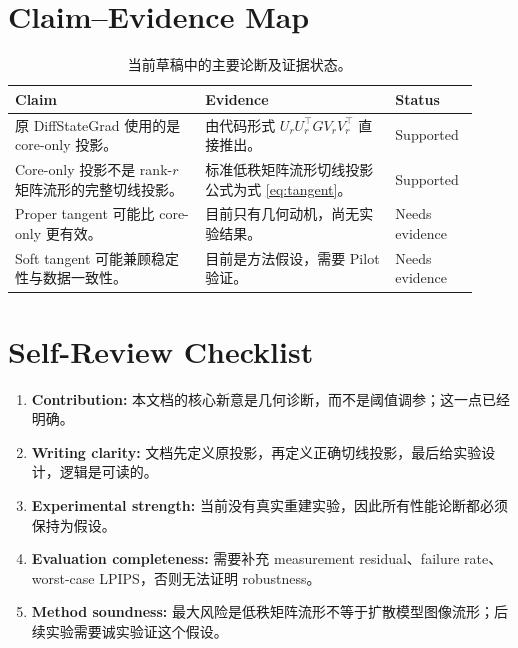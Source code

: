 \documentclass[11pt]{article}
\begin{document}
\section*{Claim--Evidence Map}

\begin{table}[h]
\centering
\caption{当前草稿中的主要论断及证据状态。}
\label{tab:claims}
\begin{tabular}{p{0.38\linewidth}p{0.38\linewidth}p{0.16\linewidth}}
\toprule
Claim & Evidence & Status \\
\midrule
原 DiffStateGrad 使用的是 core-only 投影。 &
由代码形式 $U_rU_r^\top G V_rV_r^\top$ 直接推出。 &
Supported \\
\addlinespace
Core-only 投影不是 rank-$r$ 矩阵流形的完整切线投影。 &
标准低秩矩阵流形切线投影公式为式 \eqref{eq:tangent}。 &
Supported \\
\addlinespace
Proper tangent 可能比 core-only 更有效。 &
目前只有几何动机，尚无实验结果。 &
Needs evidence \\
\addlinespace
Soft tangent 可能兼顾稳定性与数据一致性。 &
目前是方法假设，需要 Pilot 验证。 &
Needs evidence \\
\bottomrule
\end{tabular}
\end{table}

\section*{Self-Review Checklist}

\begin{enumerate}[label=\textbf{\arabic*.}]
    \item \textbf{Contribution:} 本文档的核心新意是几何诊断，而不是阈值调参；这一点已经明确。
    \item \textbf{Writing clarity:} 文档先定义原投影，再定义正确切线投影，最后给实验设计，逻辑是可读的。
    \item \textbf{Experimental strength:} 当前没有真实重建实验，因此所有性能论断都必须保持为假设。
    \item \textbf{Evaluation completeness:} 需要补充 measurement residual、failure rate、worst-case LPIPS，否则无法证明 robustness。
    \item \textbf{Method soundness:} 最大风险是低秩矩阵流形不等于扩散模型图像流形；后续实验需要诚实验证这个假设。
\end{enumerate}
\end{document}
